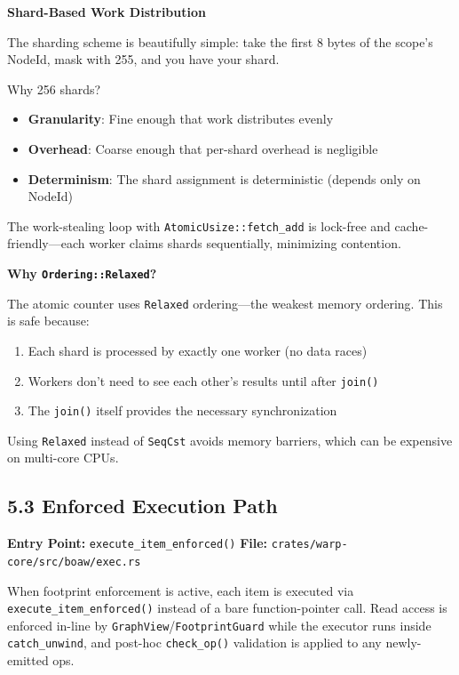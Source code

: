 \documentclass[11pt]{book}
\begin{document}
\begin{cleverpattern}
\textbf{Shard-Based Work Distribution}

The sharding scheme is beautifully simple: take the first 8 bytes of the scope's NodeId, mask with 255, and you have your shard.

Why 256 shards?
\begin{itemize}
\item \textbf{Granularity}: Fine enough that work distributes evenly
\item \textbf{Overhead}: Coarse enough that per-shard overhead is negligible
\item \textbf{Determinism}: The shard assignment is deterministic (depends only on NodeId)
\end{itemize}

The work-stealing loop with \texttt{AtomicUsize::fetch\_add} is lock-free and cache-friendly---each worker claims shards sequentially, minimizing contention.
\end{cleverpattern}

\begin{deepdive}
\textbf{Why \texttt{Ordering::Relaxed}?}

The atomic counter uses \texttt{Relaxed} ordering---the weakest memory ordering. This is safe because:

\begin{enumerate}
\item Each shard is processed by exactly one worker (no data races)
\item Workers don't need to see each other's results until after \texttt{join()}
\item The \texttt{join()} itself provides the necessary synchronization
\end{enumerate}

Using \texttt{Relaxed} instead of \texttt{SeqCst} avoids memory barriers, which can be expensive on multi-core CPUs.
\end{deepdive}

\subsection{5.3 Enforced Execution Path}\label{enforced-execution-path}

\textbf{Entry Point:} \texttt{execute\_item\_enforced()}
\textbf{File:} \texttt{crates/warp-core/src/boaw/exec.rs}

When footprint enforcement is active, each item is executed via
\texttt{execute\_item\_enforced()} instead of a bare function-pointer call.
Read access is enforced in-line by \texttt{GraphView}/\texttt{FootprintGuard}
while the executor runs inside \texttt{catch\_unwind}, and post-hoc
\texttt{check\_op()} validation is applied to any newly-emitted ops.
\end{document}
